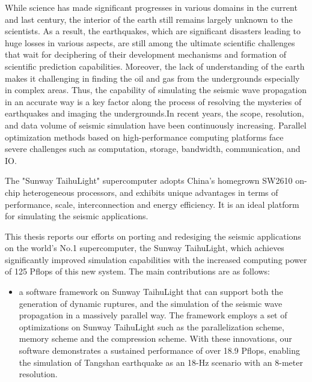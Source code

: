
\begin{eabstract}
   While science has made significant progresses in various domains in the current and last century, the interior of the earth still remains largely unknown to the scientists. As a result, the earthquakes, which are significant disasters leading to huge losses in various aspects, are still among the ultimate scientific challenges that wait for deciphering of their development mechanisms and formation of scientific prediction capabilities. Moreover, the lack of understanding of the earth makes it challenging in finding the oil and gas from the undergrounds especially in complex areas.  Thus, the capability of simulating the seismic wave propagation in an accurate way is a key factor along the process of resolving the mysteries of earthquakes and imaging the undergrounds.In recent years, the scope, resolution, and data volume of seismic simulation have been continuously increasing. Parallel optimization methods based on high-performance computing platforms face severe challenges such as computation, storage, bandwidth, communication, and IO. 




The "Sunway TaihuLight" supercomputer adopts China's homegrown SW2610 on-chip heterogeneous processors, and exhibits unique advantages in terms of performance, scale, interconnection and energy efficiency. It is an ideal platform for simulating the seismic applications. 

This thesis reports our efforts on porting and redesiging the seismic applications on the world's No.1 supercomputer, the Sunway TaihuLight, which achieves significantly improved simulation capabilities with the increased computing power of 125 Pflops of this new system. The main contributions are as follows:

\begin{itemize}
  \item a software framework on Sunway TaihuLight that can support both the generation of dynamic ruptures, and the simulation of the seismic wave propagation in a massively parallel way. The framework employs a set of optimizations on Sunway TaihuLight such as the parallelization scheme, memory scheme and the compression scheme. With these innovations, our software demonstrates a sustained performance of over 18.9 Pflops, enabling the simulation of Tangshan earthquake as an 18-Hz scenario with an 8-meter resolution.


\end{itemize}
\end{eabstract}
